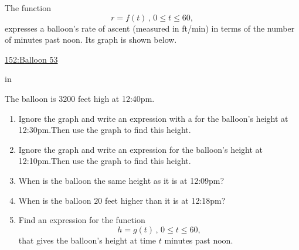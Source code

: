 \documentclass{ximera}
\newcommand{\pskip}{\vskip 0.1 in}
\begin{document}
\begin{question} \label{EdfdhUERr3rDR}
The function 
\[
    r = f(t) \, , \, 0\leq t \leq  60 , 
\]
expresses a balloon's rate of ascent (measured in ft/min) in terms of the number of minutes past noon. Its graph is shown below.

\begin{onlineOnly}
    \begin{center}
\end{center}
\end{onlineOnly}

\href{https://www.desmos.com/calculator/vfk9toeayo}{152:Balloon 53}

\pskip

The balloon is $3200$ feet high at 12:40pm.

\begin{enumerate}
\item Ignore the graph and write an expression with a for the balloon's height at 12:30pm.Then use the graph to find this height.

\item Ignore the graph and write an expression for the balloon's height at 12:10pm.Then use the graph to find this height.

\item When is the balloon the same height as it is at 12:09pm?

\item When is the balloon $20$ feet higher than it is at 12:18pm?


\item Find an expression for the function 
\[
         h=g(t) \, , \, 0\leq t \leq 60, 
\]
that gives the balloon's height at time $t$ minutes past noon.
\end{enumerate}
\end{question}
\end{document}
